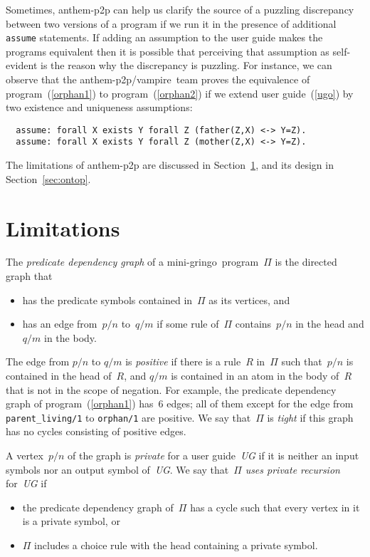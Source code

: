 \documentclass{new_tlp}
\def\gringo{{\sc gringo}}
\def\vampire{{\sc vampire}}
\begin{document}
Sometimes, {\sc anthem-p2p} can 
help us clarify the source of a puzzling discrepancy between two versions
of a program if we run it in the presence of additional \verb|assume|
statements.  If
adding an assumption to the user guide makes the programs equivalent then
it is possible that perceiving that assumption as self-evident
is the reason why the discrepancy is puzzling.  For
instance, we can observe that
the {\sc anthem-p2p}/\vampire\ team
proves the equivalence of
program~(\ref{orphan1}) to program~(\ref{orphan2}) if we extend user
guide~(\ref{ugo}) by two existence and uniqueness assumptions:
\begin{verbatim}
  assume: forall X exists Y forall Z (father(Z,X) <-> Y=Z).
  assume: forall X exists Y forall Z (mother(Z,X) <-> Y=Z).
\end{verbatim}

The limitations of {\sc anthem-p2p} are discussed in Section~\ref{sec:lim},
and its design in Section~\ref{sec:ontop}.

\section{Limitations}\label{sec:lim}

The \emph{predicate dependency graph} of a mini-\gringo\
program~$\Pi$ \cite[Section~6.3]{fan20} is the directed graph that
\begin{itemize}
\item has the predicate symbols contained in~$\Pi$ as its vertices, and
\item has an edge from~$p/n$ to~$q/m$ if some rule of~$\Pi$
  contains~$p/n$ in the head and $q/m$ in the body.
\end{itemize}
The edge from $p/n$ to $q/m$ is \emph{positive} if there is a rule~$R$
in~$\Pi$ such that~$p/n$ is contained in the head of~$R$, and $q/m$ is
contained in an atom in the body of~$R$ that is not in the scope of
negation.  For example, the predicate dependency graph
of program~(\ref{orphan1}) has~6 edges; all of them except for the edge
from \verb|parent_living/1| to \verb|orphan/1| are positive.
We say that~$\Pi$ is \emph{tight} if this graph has no
cycles consisting of positive edges.

A vertex~$p/n$ of the graph is \emph{private} for a user
guide~\emph{UG} if it is neither an input symbols nor an output
symbol of~\emph{UG}.  We say that~$\Pi$ \emph{uses private recursion}
for~\emph{UG} if
\begin{itemize}
\item the predicate dependency graph of~$\Pi$ has a cycle such that
  every vertex in it is a private symbol, or
\item $\Pi$ includes a choice rule with the head containing a private
  symbol.
\end{itemize}
\end{document}
